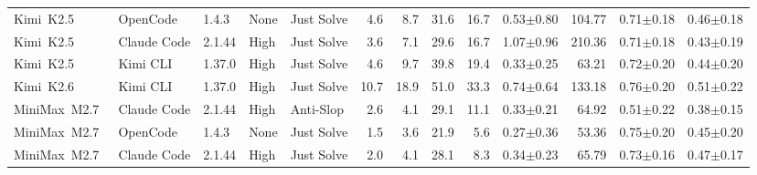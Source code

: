 \begin{table}[t]
{\begin{tabular}{l l l l l | rrrr | rr | rr}
\midrule
Kimi~K2.5~\citep{kimi_k25} & OpenCode & 1.4.3 & None & Just Solve & 4.6 & 8.7 & 31.6 & 16.7 & 0.53{\scriptsize$\pm$0.80} & 104.77 & 0.71{\scriptsize$\pm$0.18} & 0.46{\scriptsize$\pm$0.18} \\
Kimi~K2.5 & Claude Code & 2.1.44 & High & Just Solve & 3.6 & 7.1 & 29.6 & 16.7 & 1.07{\scriptsize$\pm$0.96} & 210.36 & 0.71{\scriptsize$\pm$0.18} & 0.43{\scriptsize$\pm$0.19} \\
Kimi~K2.5 & Kimi CLI & 1.37.0 & High & Just Solve & 4.6 & 9.7 & 39.8 & 19.4 & 0.33{\scriptsize$\pm$0.25} & 63.21 & 0.72{\scriptsize$\pm$0.20} & 0.44{\scriptsize$\pm$0.20} \\
\midrule
Kimi~K2.6~\citep{kimi_k26} & Kimi CLI & 1.37.0 & High & Just Solve & 10.7 & 18.9 & 51.0 & 33.3 & 0.74{\scriptsize$\pm$0.64} & 133.18 & 0.76{\scriptsize$\pm$0.20} & 0.51{\scriptsize$\pm$0.22} \\
\midrule
MiniMax~M2.7~\citep{minimax_m27} & Claude Code & 2.1.44 & High & Anti-Slop & 2.6 & 4.1 & 29.1 & 11.1 & 0.33{\scriptsize$\pm$0.21} & 64.92 & 0.51{\scriptsize$\pm$0.22} & 0.38{\scriptsize$\pm$0.15} \\
MiniMax~M2.7 & OpenCode & 1.4.3 & None & Just Solve & 1.5 & 3.6 & 21.9 & 5.6 & 0.27{\scriptsize$\pm$0.36} & 53.36 & 0.75{\scriptsize$\pm$0.20} & 0.45{\scriptsize$\pm$0.20} \\
MiniMax~M2.7 & Claude Code & 2.1.44 & High & Just Solve & 2.0 & 4.1 & 28.1 & 8.3 & 0.34{\scriptsize$\pm$0.23} & 65.79 & 0.73{\scriptsize$\pm$0.16} & 0.47{\scriptsize$\pm$0.17} \\
\bottomrule
\end{tabular}%
}
\end{table}